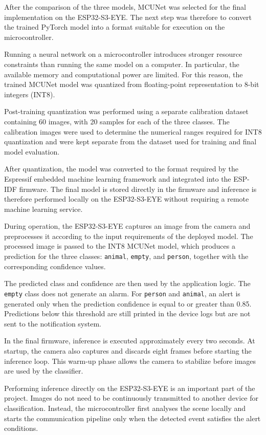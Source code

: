 \documentclass{article}
\begin{document}
After the comparison of the three models, MCUNet was selected for the final
implementation on the ESP32-S3-EYE. The next step was therefore to convert
the trained PyTorch model into a format suitable for execution on the
microcontroller.

Running a neural network on a microcontroller introduces stronger resource
constraints than running the same model on a computer. In particular, the
available memory and computational power are limited. For this reason, the
trained MCUNet model was quantized from floating-point representation to
8-bit integers (INT8).

Post-training quantization was performed using a separate calibration
dataset containing 60 images, with 20 samples for each of the three classes.
The calibration images were used to determine the numerical ranges required
for INT8 quantization and were kept separate from the dataset used for
training and final model evaluation.

After quantization, the model was converted to the format required by the
Espressif embedded machine learning framework and integrated into the
ESP-IDF firmware. The final model is stored directly in the firmware and
inference is therefore performed locally on the ESP32-S3-EYE without
requiring a remote machine learning service.

During operation, the ESP32-S3-EYE captures an image from the camera and
preprocesses it according to the input requirements of the deployed model.
The processed image is passed to the INT8 MCUNet model, which produces a
prediction for the three classes: \texttt{animal}, \texttt{empty}, and
\texttt{person}, together with the corresponding confidence values.

The predicted class and confidence are then used by the application logic.
The \texttt{empty} class does not generate an alarm. For
\texttt{person} and \texttt{animal}, an alert is generated only when the
prediction confidence is equal to or greater than 0.85. Predictions below
this threshold are still printed in the device logs but are not sent to
the notification system.

In the final firmware, inference is executed approximately every two
seconds. At startup, the camera also captures and discards eight frames
before starting the inference loop. This warm-up phase allows the camera
to stabilize before images are used by the classifier.

Performing inference directly on the ESP32-S3-EYE is an important part of
the project. Images do not need to be continuously transmitted to another
device for classification. Instead, the microcontroller first analyses the
scene locally and starts the communication pipeline only when the detected
event satisfies the alert conditions.
\end{document}
